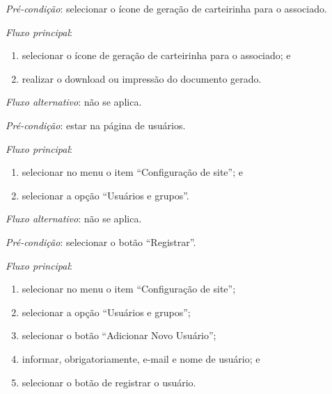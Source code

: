 \vspace{0.7cm}

\noindent \textit{Pré-condição}: selecionar o ícone de geração de carteirinha para o associado.

\noindent \textit{Fluxo principal}:

\begin{enumerate}
    \item selecionar o ícone de geração de carteirinha para o associado; e
    \item realizar o download ou impressão do documento gerado.
\end{enumerate}

\noindent \textit{Fluxo alternativo}: não se aplica.


\vspace{0.7cm}

\noindent \textit{Pré-condição}: estar na página de usuários.

\noindent \textit{Fluxo principal}:

\begin{enumerate}
    \item selecionar no menu o item ``Configuração de site''; e
    \item selecionar a opção ``Usuários e grupos''.
\end{enumerate}

\noindent \textit{Fluxo alternativo}: não se aplica.



\vspace{0.7cm}

\noindent \textit{Pré-condição}: selecionar o botão ``Registrar''.

\noindent \textit{Fluxo principal}:

\begin{enumerate}
    \item selecionar no menu o item ``Configuração de site'';
    \item selecionar a opção ``Usuários e grupos'';
    \item selecionar o botão ``Adicionar Novo Usuário'';
    \item informar, obrigatoriamente, e-mail e nome de usuário; e
    \item selecionar o botão de registrar o usuário.
\end{enumerate}

